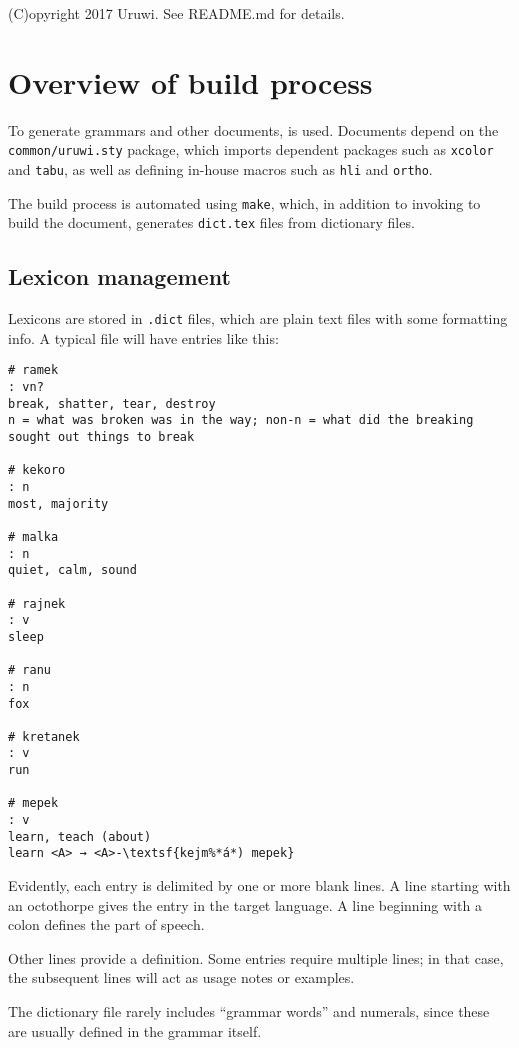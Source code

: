 \documentclass{book}
\begin{document}
(C)opyright 2017 Uruwi. See README.md for details.

\tableofcontents

\chapter{Overview of build process}

To generate grammars and other documents, \XeLaTeX{} is used. Documents depend on the \texttt{common/uruwi.sty} package, which imports dependent packages such as \texttt{xcolor} and \texttt{tabu}, as well as defining in-house macros such as \texttt{\bs{}hli} and \texttt{\bs{}ortho}.

The build process is automated using \texttt{make}, which, in addition to invoking \XeLaTeX{} to build the document, generates \texttt{dict.tex} files from dictionary files.

\section{Lexicon management}

Lexicons are stored in \texttt{.dict} files, which are plain text files with some formatting info. A typical file will have entries like this:

\begin{lstlisting}
# ramek
: vn?
break, shatter, tear, destroy
n = what was broken was in the way; non-n = what did the breaking sought out things to break

# kekoro
: n
most, majority

# malka
: n
quiet, calm, sound

# rajnek
: v
sleep

# ranu
: n
fox

# kretanek
: v
run

# mepek
: v
learn, teach (about)
learn <A> → <A>-\textsf{kejm%*á*) mepek}
\end{lstlisting}

Evidently, each entry is delimited by one or more blank lines. A line starting with an octothorpe gives the entry in the target language. A line beginning with a colon defines the part of speech.

Other lines provide a definition. Some entries require multiple lines; in that case, the subsequent lines will act as usage notes or examples.

The dictionary file rarely includes ``grammar words'' and numerals, since these are usually defined in the grammar itself.
\end{document}
